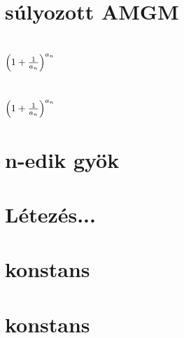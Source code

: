 \begin{spacing}{1.2}
\section*{súlyozott AMGM} \label{DBeL3}
\Desc{

}
\vspace{0.5cm}
\newpage
\section*{${ \left( 1+\frac{1}{a_n} \right) }^{a_n}$} \label{DBe3}
\Fa{

}
\vspace{0.5cm}
\newpage
\section*{${ \left( 1+\frac{1}{a_n} \right) }^{a_n}$} \label{DBe3Mo}
\Mo{

}
\vspace{0.5cm}
\newpage
\section*{n-edik gyök} \label{DBnthroot}
\newline
{}
\newline
{}
\newline
{}
\newline
{}
\vspace{0.5cm}
\newpage
\section*{Létezés...} \label{DBnthrootSum}
\Desc{

}
\vspace{0.5cm}
\newpage
\section*{konstans} \label{DBnthroot1}
\Fa{

}
\vspace{0.5cm}
\newpage
\section*{konstans} \label{DBnthroot1Mo}
\Mo{

}
\vspace{0.5cm}
\newpage

\end{spacing}
